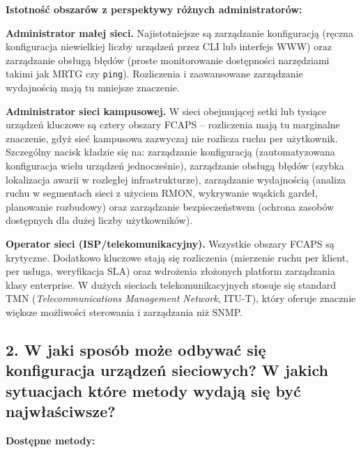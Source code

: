 \documentclass[12pt,a4paper]{article}
\begin{document}
\textbf{Istotność obszarów z perspektywy różnych administratorów:}

\textbf{Administrator małej sieci.}
Najistotniejsze są zarządzanie konfiguracją (ręczna konfiguracja niewielkiej
liczby urządzeń przez CLI lub interfejs WWW) oraz zarządzanie obsługą błędów
(proste monitorowanie dostępności narzędziami takimi jak MRTG czy \texttt{ping}).
Rozliczenia i zaawansowane zarządzanie wydajnością mają tu mniejsze znaczenie.

\textbf{Administrator sieci kampusowej.}
W sieci obejmującej setki lub tysiące urządzeń kluczowe są cztery obszary
FCAPS -- rozliczenia mają tu marginalne znaczenie, gdyż sieć kampusowa
zazwyczaj nie rozlicza ruchu per użytkownik. Szczególny nacisk kładzie się na:
zarządzanie konfiguracją (zautomatyzowana konfiguracja wielu urządzeń
jednocześnie), zarządzanie obsługą błędów (szybka lokalizacja awarii
w rozległej infrastrukturze), zarządzanie wydajnością (analiza ruchu
w segmentach sieci z użyciem RMON, wykrywanie wąskich gardeł, planowanie
rozbudowy) oraz zarządzanie bezpieczeństwem (ochrona zasobów dostępnych dla
dużej liczby użytkowników).

\textbf{Operator sieci (ISP/telekomunikacyjny).}
Wszystkie obszary FCAPS są krytyczne. Dodatkowo kluczowe stają się rozliczenia
(mierzenie ruchu per klient, per usługa, weryfikacja SLA) oraz wdrożenia
złożonych platform zarządzania klasy enterprise. W dużych sieciach
telekomunikacyjnych stosuje się standard TMN (\emph{Telecommunications
Management Network}, ITU-T), który oferuje znacznie większe możliwości
sterowania i zarządzania niż SNMP.

\subsection*{2. W jaki sposób może odbywać się konfiguracja urządzeń sieciowych?
W jakich sytuacjach które metody wydają się być najwłaściwsze?}

\textbf{Dostępne metody:}
\end{document}
